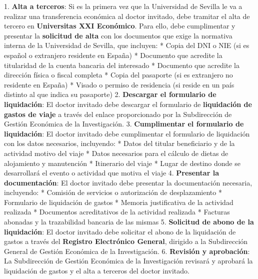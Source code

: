 \documentclass{article}
\begin{document}
\begin{itemize}
\begin{itemize}
                        1. \textbf{Alta a terceros}: Si es la primera vez que la Universidad de Sevilla le va a realizar una transferencia económica al doctor invitado, debe tramitar el alta de tercero en \textbf{Universitas XXI Económico}. Para ello, debe cumplimentar y presentar la \textbf{solicitud de alta} con los documentos que exige la normativa interna de la Universidad de Sevilla, que incluyen:
                        * Copia del DNI o NIE (si es español o extranjero residente en España)
                        * Documento que acredite la titularidad de la cuenta bancaria del interesado
                        * Documento que acredite la dirección física o fiscal completa
                        * Copia del pasaporte (si es extranjero no residente en España)
                        * Visado o permiso de residencia (si reside en un país distinto al que indica su pasaporte)
                        2. \textbf{Descargar el formulario de liquidación}: El doctor invitado debe descargar el formulario de \textbf{liquidación de gastos de viaje} a través del enlace proporcionado por la Subdirección de Gestión Económica de la Investigación.
                        3. \textbf{Cumplimentar el formulario de liquidación}: El doctor invitado debe cumplimentar el formulario de liquidación con los datos necesarios, incluyendo:
                        * Datos del titular beneficiario y de la actividad motivo del viaje
                        * Datos necesarios para el cálculo de dietas de alojamiento y manutención
                        * Itinerario del viaje
                        * Lugar de destino donde se desarrollará el evento o actividad que motiva el viaje
                        4. \textbf{Presentar la documentación}: El doctor invitado debe presentar la documentación necesaria, incluyendo:
                        * Comisión de servicios o autorización de desplazamiento
                        * Formulario de liquidación de gastos
                        * Memoria justificativa de la actividad realizada
                        * Documentos acreditativos de la actividad realizada
                        * Facturas abonadas y la trazabilidad bancaria de las mismas
                        5. \textbf{Solicitud de abono de la liquidación}: El doctor invitado debe solicitar el abono de la liquidación de gastos a través del \textbf{Registro Electrónico General}, dirigido a la Subdirección General de Gestión Económica de la Investigación.
                        6. \textbf{Revisión y aprobación}: La Subdirección de Gestión Económica de la Investigación revisará y aprobará la liquidación de gastos y el alta a terceros del doctor invitado.


\end{itemize}
\end{itemize}
\end{document}
